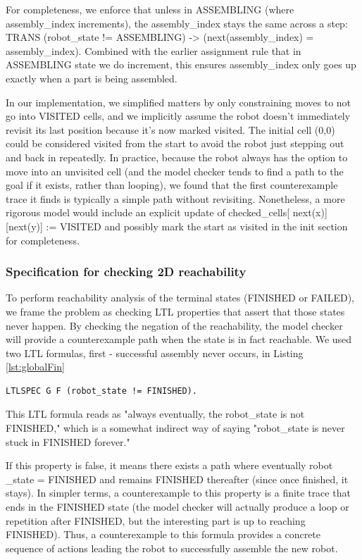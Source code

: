 For completeness, we enforce that unless in ASSEMBLING (where assembly\_index increments),
the assembly\_index stays the same across a step: 
TRANS (robot\_state != ASSEMBLING) -> (next(assembly\_index) = assembly\_index). 
Combined with the earlier assignment rule that in ASSEMBLING state we do increment, 
this ensures assembly\_index only goes up exactly when a part is being 
assembled.

In our implementation, we simplified matters by 
only constraining moves to not go into VISITED cells, and we implicitly assume 
the robot doesn't immediately revisit its last position because it's now marked visited.
The initial cell (0,0) could be considered visited 
from the start to avoid the robot just stepping out and back in repeatedly.
In practice, because the robot always has the option to move into an 
unvisited cell (and the model checker tends to find a path to the goal 
if it exists, rather than looping), we found that the first counterexample trace 
it finds is typically a simple path without revisiting. 
Nonetheless, a more rigorous model would include an explicit update of checked\_cells[
next(x)][next(y)] := VISITED and possibly mark the start as visited in 
the init section for completeness.


\subsubsection{Specification for checking 2D reachability}

To perform reachability analysis of the terminal states (FINISHED or FAILED), 
we frame the problem as checking LTL properties that assert that those 
states never happen. By checking the negation of the reachability, 
the model checker will provide a counterexample path 
when the state is in fact reachable. 
We used two LTL formulas, first - successful assembly never occurs, in Listing \ref{lst:globalFin}

\begin{lstlisting}[language=NuSMV, caption={Terminal conditions for FINISHED and FAILED}, 
    label={lst:globalFin}]
    LTLSPEC G F (robot_state != FINISHED). 
\end{lstlisting}

This LTL formula reads as "always eventually, the robot\_state is not 
FINISHED," which is a somewhat indirect way of saying "robot\_state is 
never stuck in FINISHED forever." 

If this property is false, it means there exists a path where eventually robot
\_state = FINISHED and remains FINISHED thereafter (since once finished, 
it stays). In simpler terms, a counterexample to this property is 
a finite trace that ends in 
the FINISHED state (the model checker will actually produce a loop or 
repetition after FINISHED, but the interesting part is up to reaching FINISHED). 
Thus, a counterexample to this formula provides a concrete sequence of 
actions leading the robot to successfully assemble the new robot.

